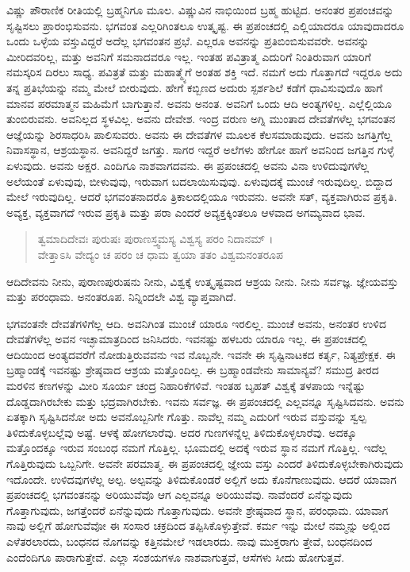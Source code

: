 ವಿಷ್ಣು ಪೌರಾಣಿಕ ರೀತಿಯಲ್ಲಿ ಬ್ರಹ್ಮನಿಗೂ ಮೂಲ. ವಿಷ್ಣುವಿನ ನಾಭಿಯಿಂದ ಬ್ರಹ್ಮ ಹುಟ್ಟಿದ. ಅನಂತರ ಪ್ರಪಂಚವನ್ನು ಸೃಷ್ಟಿಸಲು ಪ್ರಾರಂಭಿಸುವನು. ಭಗವಂತ ಎಲ್ಲರಿಗಿಂತಲೂ ಉತ್ಕೃಷ್ಟ. ಈ ಪ್ರಪಂಚದಲ್ಲಿ ಎಲ್ಲಿಯಾದರೂ ಯಾವುದಾದರೂ ಒಂದು ಒಳ್ಳೆಯ ವಸ್ತುವಿದ್ದರೆ ಅದೆಲ್ಲ ಭಗವಂತನ ಪ್ರಭೆ. ಎಲ್ಲರೂ ಅವನನ್ನು ಪ್ರತಿಬಿಂಬಿಸುವವರೇ. ಅವನನ್ನು ಮೀರಿದವರಿಲ್ಲ, ಮತ್ತು ಅವನಿಗೆ ಸಮನಾದವರೂ ಇಲ್ಲ. ಇಂತಹ ಪವಿತ್ರಾತ್ಮ ಎದುರಿಗೆ ನಿಂತಿರುವಾಗ ಯಾರಿಗೆ ನಮಸ್ಕರಿಸ ದಿರಲು ಸಾಧ್ಯ. ಪವಿತ್ರತೆ ಮತ್ತು ಮಹಾತ್ಮ್ಯೆಗೆ ಅಂತಹ ಶಕ್ತಿ ಇದೆ. ನಮಗೆ ಅದು ಗೊತ್ತಾಗದೆ ಇದ್ದರೂ ಅದು ತನ್ನ ಪ್ರತಿಭೆಯನ್ನು ನಮ್ಮ ಮೇಲೆ ಬೀರುವುದು. ಹೇಗೆ ಕಬ್ಬಿಣದ ಅದುರು ಸ್ಪರ್ಶಶಿಲೆ ಕಡೆಗೆ ಧಾವಿಸುವುದೊ ಹಾಗೆ ಮಾನವ ಪರಮಾತ್ಮನ ಮಹಿಮೆಗೆ ಬಾಗುತ್ತಾನೆ. ಅವನು ಅನಂತ. ಅವನಿಗೆ ಒಂದು ಆದಿ ಅಂತ್ಯಗಳಿಲ್ಲ. ಎಲ್ಲೆಲ್ಲಿಯೂ ತುಂಬಿರುವನು. ಅವನಿಲ್ಲದ ಸ್ಥಳವಿಲ್ಲ. ಅವನು ದೇವೇಶ. ಇಂದ್ರ ವರುಣ ಅಗ್ನಿ ಮುಂತಾದ ದೇವತೆಗಳೆಲ್ಲ ಭಗವಂತನ ಆಜ್ಞೆಯನ್ನು ಶಿರಸಾಧರಿಸಿ ಪಾಲಿಸುವರು. ಅವನು ಈ ದೇವತೆಗಳ ಮೂಲಕ ಕೆಲಸಮಾಡುವುದು. ಅವನು ಜಗತ್ತಿಗೆಲ್ಲ ನಿವಾಸಸ್ಥಾನ, ಆಶ್ರಯಸ್ಥಾನ. ಅವನಿದ್ದರೆ ಜಗತ್ತು. ಸಾಗರ ಇದ್ದರೆ ಅಲೆಗಳು ಹೇಗೋ ಹಾಗೆ ಅವನಿಂದ ಜಗತ್ತಿನ ಗುಳ್ಳೆ ಏಳುವುದು. ಅವನು ಅಕ್ಷರ. ಎಂದಿಗೂ ನಾಶವಾಗದವನು. ಈ ಪ್ರಪಂಚದಲ್ಲಿ ಅವನು ವಿನಾ ಉಳಿದುವುಗಳೆಲ್ಲ ಅಲೆಯಂತೆ ಏಳುವುವು, ಬೀಳುವುವು, ಇರುವಾಗ ಬದಲಾಯಿಸುವುವು. ಏಳುವುದಕ್ಕೆ ಮುಂಚೆ ಇರುವುದಿಲ್ಲ. ಬಿದ್ದಾದ ಮೇಲೆ ಇರುವುದಿಲ್ಲ. ಆದರೆ ಭಗವಂತನಾದರೊ ತ್ರಿಕಾಲದಲ್ಲಿಯೂ ಇರುವನು. ಅವನೇ ಸತ್, ವ್ಯಕ್ತವಾಗಿರುವ ಪ್ರಕೃತಿ. ಅವ್ಯಕ್ತ, ವ್ಯಕ್ತವಾಗದೆ ಇರುವ ಪ್ರಕೃತಿ ಮತ್ತು ಪರಾ ಎಂದರೆ ಅವ್ಯಕ್ತಕ್ಕಿಂತಲೂ ಆಳವಾದ ಅಗಮ್ಯವಾದ ಭಾವ.

\begin{verse}
ತ್ವಮಾದಿದೇವಃ ಪುರುಷಃ ಪುರಾಣಸ್ತ್ವಮಸ್ಯ ವಿಶ್ವಸ್ಯ ಪರಂ ನಿದಾನಮ್ ।\\ವೇತ್ತಾಽಸಿ ವೇದ್ಯಂ ಚ ಪರಂ ಚ ಧಾಮ ತ್ವಯಾ ತತಂ ವಿಶ್ವಮನಂತರೂಪ 
\end{verse}

{\small ಆದಿದೇವನು ನೀನು, ಪುರಾಣಪುರುಷನು ನೀನು, ವಿಶ್ವಕ್ಕೆ ಉತ್ಕೃಷ್ಟವಾದ ಆಶ್ರಯ ನೀನು. ನೀನು ಸರ್ವಜ್ಞ. ಜ್ಞೇಯವಸ್ತು ಮತ್ತು ಪರಂಧಾಮ. ಅನಂತರೂಪ. ನಿನ್ನಿಂದಲೇ ವಿಶ್ವ ವ್ಯಾಪ್ತವಾಗಿದೆ.}

ಭಗವಂತನೇ ದೇವತೆಗಳಿಗೆಲ್ಲ ಆದಿ. ಅವನಿಗಿಂತ ಮುಂಚೆ ಯಾರೂ ಇರಲಿಲ್ಲ. ಮುಂಚೆ ಅವನು, ಅನಂತರ ಉಳಿದ ದೇವತೆಗಳೆಲ್ಲ ಅವನ ಇಚ್ಛಾಮಾತ್ರದಿಂದ ಜನಿಸಿದರು. ಇವನಷ್ಟು ಹಳಬರು ಯಾರೂ ಇಲ್ಲ. ಈ ಪ್ರಪಂಚದಲ್ಲಿ ಆದಿಯಿಂದ ಅಂತ್ಯದವರೆಗೆ ನೋಡುತ್ತಿರುವವನು ಇವ ನೊಬ್ಬನೇ. ಇವನೇ ಈ ಸೃಷ್ಟಿನಾಟಕದ ಕರ್ತೃ, ನಿತ್ಯಪ್ರೇಕ್ಷಕ. ಈ ಬ್ರಹ್ಮಾಂಡಕ್ಕೆ ಇವನಷ್ಟು ಶ್ರೇಷ್ಠವಾದ ಆಶ್ರಯ ಮತ್ತೊಂದಿಲ್ಲ. ಈ ಬ್ರಹ್ಮಾಂಡವೇನು ಸಾಮಾನ್ಯವೆ? ಸಮುದ್ರ ತೀರದ ಮರಳಿನ ಕಣಗಳನ್ನು ಮೀರಿ ಸೂರ್ಯ ಚಂದ್ರ ನಿಹಾರಿಕೆಗಳಿವೆ. ಇಂತಹ ಬೃಹತ್ ವಿಶ್ವಕ್ಕೆ ತಳಪಾಯ ಇನ್ನೆಷ್ಟು ದೊಡ್ಡದಾಗಿರಬೇಕು ಮತ್ತು ಭದ್ರವಾಗಿರಬೇಕು. ಇವನು ಸರ್ವಜ್ಞ. ಈ ಪ್ರಪಂಚದಲ್ಲಿ ಎಲ್ಲವನ್ನೂ ಸೃಷ್ಟಿಸಿದವನು. ಅವನು ಏತಕ್ಕಾಗಿ ಸೃಷ್ಟಿಸಿದನೋ ಅದು ಅವನೊಬ್ಬನಿಗೇ ಗೊತ್ತು. ನಾವೆಲ್ಲ ನಮ್ಮ ಎದುರಿಗೆ ಇರುವ ವಸ್ತುವನ್ನು ಸ್ವಲ್ಪ ತಿಳಿದುಕೊಳ್ಳಬಲ್ಲೆವು ಅಷ್ಟೆ. ಆಳಕ್ಕೆ ಹೋಗಲಾರೆವು. ಅದರ ಗುಣಗಳನ್ನೆಲ್ಲ ತಿಳಿದುಕೊಳ್ಳಲಾರೆವು. ಅದಕ್ಕೂ ಮತ್ತೊಂದಕ್ಕೂ ಇರುವ ಸಂಬಂಧ ನಮಗೆ ಗೊತ್ತಿಲ್ಲ. ಭೂಮದಲ್ಲಿ ಅದಕ್ಕೆ ಇರುವ ಸ್ಥಾನ ನಮಗೆ ಗೊತ್ತಿಲ್ಲ. ಇದೆಲ್ಲ ಗೊತ್ತಿರುವುದು ಒಬ್ಬನಿಗೇ. ಅವನೇ ಪರಮಾತ್ಮ. ಈ ಪ್ರಪಂಚದಲ್ಲಿ ಜ್ಞೇಯ ವಸ್ತು ಎಂದರೆ ತಿಳಿದುಕೊಳ್ಳಬೇಕಾಗಿರುವುದು ಇದೊಂದೇ. ಉಳಿದವುಗಳೆಲ್ಲ ಅಲ್ಪ. ಅಲ್ಪವನ್ನು ತಿಳಿದುಕೊಂಡರೆ ಅಲ್ಲಿಗೆ ಅದು ಕೊನೆಗಾಣುವುದು. ಆದರೆ ಯಾವಾಗ ಪ್ರಪಂಚದಲ್ಲಿ ಭಗವಂತನನ್ನು ಅರಿಯುವೆವೊ ಆಗ ಎಲ್ಲವನ್ನೂ ಅರಿಯುವೆವು. ನಾವೆಂದರೆ ಏನೆನ್ನುವುದು ಗೊತ್ತಾಗುವುದು, ಜಗತ್ತೆಂದರೆ ಏನೆನ್ನುವುದು ಗೊತ್ತಾಗುವುದು. ಅವನೇ ಶ್ರೇಷ್ಠವಾದ ಸ್ಥಾನ, ಪರಂಧಾಮ. ಯಾವಾಗ ನಾವು ಅಲ್ಲಿಗೆ ಹೋಗುವೆವೋ ಈ ಸಂಸಾರ ಚಕ್ರದಿಂದ ತಪ್ಪಿಸಿಕೊಳ್ಳುತ್ತೇವೆ. ಕರ್ಮ ಇನ್ನು ಮೇಲೆ ನಮ್ಮನ್ನು ಅಲ್ಲಿಂದ ಎಳೆತರಲಾರದು, ಬಂಧನದ ನೊಗವನ್ನು ಕತ್ತಿನಮೇಲೆ ಇಡಲಾರದು. ನಾವು ಮುಕ್ತರಾಗು ತ್ತೇವೆ, ಬಂಧನದಿಂದ ಎಂದೆಂದಿಗೂ ಪಾರಾಗುತ್ತೇವೆ. ಎಲ್ಲಾ ಸಂಶಯಗಳೂ ನಾಶವಾಗುತ್ತವೆ, ಆಸೆಗಳು ಸೀದು ಹೋಗುತ್ತವೆ.

